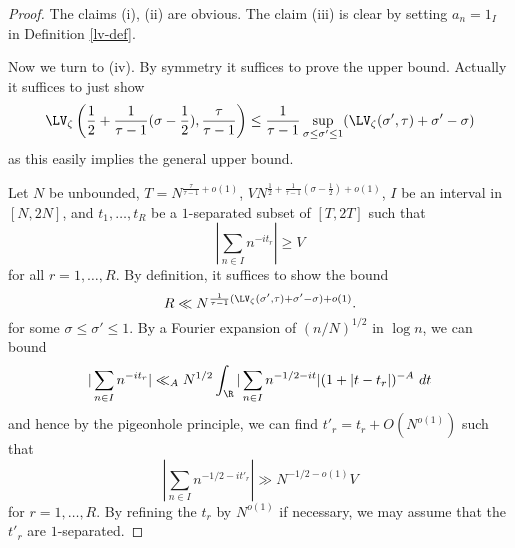 \begin{proof}  The claims (i), (ii) are obvious.  The claim (iii) is clear by setting $a_n = 1_I$ in Definition \ref{lv-def}.  
    
Now we turn to (iv).  By symmetry it suffices to prove the upper bound.  Actually it suffices to just show
$$ \LV_\zeta\left(\frac{1}{2} + \frac{1}{\tau-1} (\sigma-\frac{1}{2}), \frac{\tau}{\tau-1}\right) \leq \frac{1}{\tau-1} \sup_{\sigma \leq \sigma' \leq 1} (\LV_\zeta(\sigma',\tau) + \sigma'-\sigma)$$
as this easily implies the general upper bound. 

Let $N$ be unbounded, $T= N^{\frac{\tau}{\tau-1}+o(1)}$, $V  N^{\frac{1}{2} + \frac{1}{\tau-1} (\sigma-\frac{1}{2})+o(1)}$, $I$ be an interval in $[N,2N]$, and $t_1,\dots,t_R$ be a $1$-separated subset of $[T,2T]$ such that
$$ |\sum_{n \in I} n^{-it_r}| \geq V$$
for all $r=1,\dots,R$. By definition, it suffices to show the bound
\begin{equation}\label{r-targ} 
    R \ll N^{\frac{1}{\tau-1} (\LV_\zeta(\sigma',\tau) + \sigma'-\sigma)+o(1)}.
\end{equation}
for some $\sigma \leq \sigma' \leq 1$.
By a Fourier expansion of $(n/N)^{1/2}$ in $\log n$, we can bound
$$ |\sum_{n \in I} n^{-it_r}| \ll_A N^{1/2} \int_\R |\sum_{n \in I} n^{-1/2-it}| (1 + |t-t_r|)^{-A}\ dt$$
and hence by the pigeonhole principle, we can find $t'_r = t_r + O(N^{o(1)})$ such that
$$ |\sum_{n \in I} n^{-1/2-it'_r}| \gg N^{-1/2-o(1)} V$$
for $r=1,\dots,R$.  By refining the $t_r$ by $N^{o(1)}$ if necessary, we may assume that the $t'_r$ are $1$-separated.


\end{proof}
